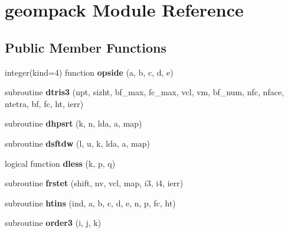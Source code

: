 \hypertarget{classgeompack}{\section{geompack Module Reference}
\label{classgeompack}
}
\subsection*{Public Member Functions}
\begin{DoxyCompactItemize}
\item 
\hypertarget{classgeompack_a2317ab8af14e0fa670245b6d67ed7b60}{integer(kind=4) function {\bfseries opside} (a, b, c, d, e)}\label{classgeompack_a2317ab8af14e0fa670245b6d67ed7b60}

\item 
\hypertarget{classgeompack_a6285805baeace70de928605567d0ea99}{subroutine {\bfseries dtris3} (npt, sizht, bf\+\_\+max, fc\+\_\+max, vcl, vm, bf\+\_\+num, nfc, nface, ntetra, bf, fc, ht, ierr)}\label{classgeompack_a6285805baeace70de928605567d0ea99}

\item 
\hypertarget{classgeompack_a7a0dea21fde829963eb4ef699df1cafc}{subroutine {\bfseries dhpsrt} (k, n, lda, a, map)}\label{classgeompack_a7a0dea21fde829963eb4ef699df1cafc}

\item 
\hypertarget{classgeompack_a23717a1d896374a24d14b4ca0c792e1f}{subroutine {\bfseries dsftdw} (l, u, k, lda, a, map)}\label{classgeompack_a23717a1d896374a24d14b4ca0c792e1f}

\item 
\hypertarget{classgeompack_a9614867a3a0edc826e6fb078cb07976c}{logical function {\bfseries dless} (k, p, q)}\label{classgeompack_a9614867a3a0edc826e6fb078cb07976c}

\item 
\hypertarget{classgeompack_a7f34140747c618d0e2392452b2e25098}{subroutine {\bfseries frstet} (shift, nv, vcl, map, i3, i4, ierr)}\label{classgeompack_a7f34140747c618d0e2392452b2e25098}

\item 
\hypertarget{classgeompack_a8719c6bd2f3f88cce35c0c64f0328926}{subroutine {\bfseries htins} (ind, a, b, c, d, e, n, p, fc, ht)}\label{classgeompack_a8719c6bd2f3f88cce35c0c64f0328926}

\item 
\hypertarget{classgeompack_ab9a0ea5a4297d18017861d316368cd3a}{subroutine {\bfseries order3} (i, j, k)}\label{classgeompack_ab9a0ea5a4297d18017861d316368cd3a}


\end{DoxyCompactItemize}
